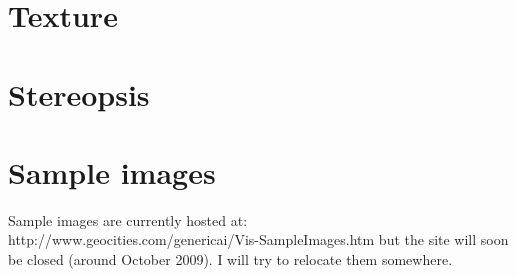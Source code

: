 \underconst

\section{Texture}

\underconst

\section{Stereopsis}

\underconst

\section{Sample images}

Sample images are currently hosted at:\\
\hspace*{1cm} http://www.geocities.com/genericai/Vis-SampleImages.htm
but the site will soon be closed (around October 2009).  I will try to relocate them somewhere.
